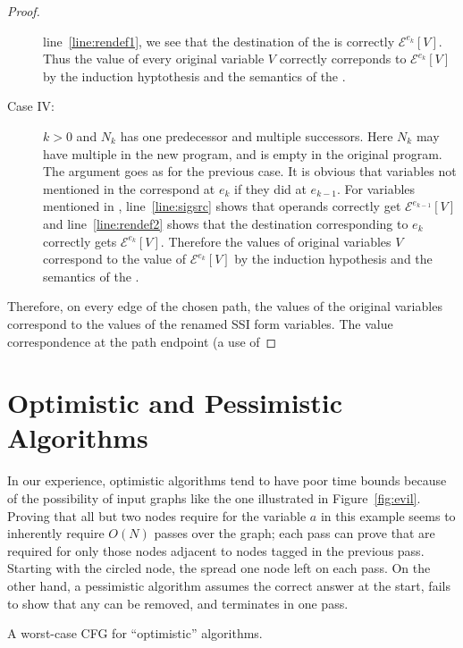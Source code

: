 \begin{proof}
\begin{description}
line~\ref{line:rendef1}, we see that the destination of the
\phifunction{} is correctly $\mathcal{E}^{e_k}[V]$.  Thus the value of
every original variable $V$ correctly correponds to
$\mathcal{E}^{e_k}[V]$ by the induction hyptothesis and the semantics
of the .
\item[Case IV:] $k>0$ and $N_k$ has one predecessor and multiple
successors.  Here $N_k$ may have multiple  in the new
program, and is empty in the original program.  The argument goes as
for the previous case.  It is obvious that variables not mentioned in
the  correspond at $e_k$ if they did at $e_{k-1}$.  For
variables mentioned in , line~\ref{line:sigsrc} shows
that operands correctly get $\mathcal{E}^{e_{k-1}}[V]$ and
line~\ref{line:rendef2} shows that the destination corresponding to
$e_k$ correctly gets $\mathcal{E}^{e_k}[V]$.  Therefore the values of
original variables $V$ correspond to the value of
$\mathcal{E}^{e_k}[V]$ by the induction hypothesis and the semantics
of the .
\end{description}
Therefore, on every edge of the chosen path, the values of the
original variables correspond to the values of the renamed SSI form
variables. The value correspondence at the path endpoint (a use of
\end{proof}

\section{Optimistic and Pessimistic Algorithms}
\label{app:optimistic}

In our experience, optimistic algorithms tend to
have poor time bounds because of the possibility of input graphs like
the one illustrated in Figure~\vref{fig:evil}.
Proving that all but two nodes require
 for the variable $a$ in this example seems to
inherently require $O(N)$ passes over the graph; each pass can prove
that  are required for only those nodes adjacent to
nodes tagged in the previous pass.  Starting with the circled node, the
 spread one node left on each pass. On the other hand,
a pessimistic algorithm assumes the correct answer at the start, fails
to show that any  can be removed, and
terminates in one pass.

\begin{myfigure}[t]
\centering\renewcommand{\figscale}{0.25}
\caption{A worst-case CFG for ``optimistic'' algorithms.}
\label{fig:evil}
\end{myfigure}
